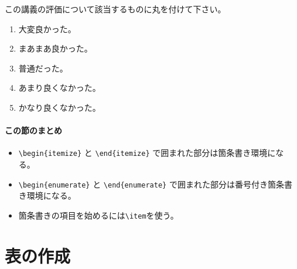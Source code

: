 \vspace*{-1.5em}
\begin{kekka}
    この講義の評価について該当するものに丸を付けて下さい。
    \begin{enumerate}
        \item 大変良かった。
        \item まあまあ良かった。
        \item 普通だった。
        \item あまり良くなかった。
        \item かなり良くなかった。
    \end{enumerate}
\end{kekka}


\paragraph{この節のまとめ}

\begin{itemize}
    \item \verb|\begin{itemize}| と \verb|\end{itemize}| で囲まれた部分は箇条書き環境になる。
    \item \verb|\begin{enumerate}| と \verb|\end{enumerate}| で囲まれた部分は番号付き箇条書き環境になる。
    \item 箇条書きの項目を始めるには\verb|\item|を使う。
\end{itemize}

\section{表の作成}
\label{sec:latex:table}

